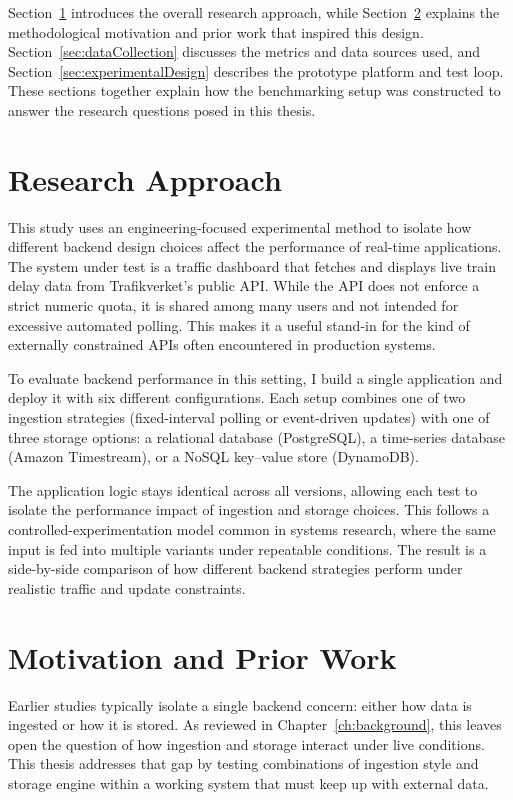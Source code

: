\documentclass[nomenclature, english, biblatex]{kththesis}
\numberwithin{listing}{chapter}
\begin{document}
Section~\ref{sec:researchProcess} introduces the overall research approach, while Section~\ref{sec:researchParadigm} explains the methodological motivation and prior work that inspired this design. Section~\ref{sec:dataCollection} discusses the metrics and data sources used, and Section~\ref{sec:experimentalDesign} describes the prototype platform and test loop. These sections together explain how the benchmarking setup was constructed to answer the research questions posed in this thesis.

\section{Research Approach}
\label{sec:researchProcess}

This study uses an engineering-focused experimental method to isolate how different backend design choices affect the performance of real-time applications. The system under test is a traffic dashboard that fetches and displays live train delay data from Trafikverket’s public API. While the API does not enforce a strict numeric quota, it is shared among many users and not intended for excessive automated polling. This makes it a useful stand-in for the kind of externally constrained APIs often encountered in production systems.

To evaluate backend performance in this setting, I build a single application and deploy it with six different configurations. Each setup combines one of two ingestion strategies (fixed-interval polling or event-driven updates) with one of three storage options: a relational database (PostgreSQL), a time-series database (Amazon Timestream), or a NoSQL key–value store (DynamoDB).

The application logic stays identical across all versions, allowing each test to isolate the performance impact of ingestion and storage choices. This follows a controlled-experimentation model common in systems research, where the same input is fed into multiple variants under repeatable conditions. The result is a side-by-side comparison of how different backend strategies perform under realistic traffic and update constraints.

\section{Motivation and Prior Work}
\label{sec:researchParadigm}

Earlier studies typically isolate a single backend concern: either how data is ingested or how it is stored. As reviewed in Chapter~\ref{ch:background}, this leaves open the question of how ingestion and storage interact under live conditions. This thesis addresses that gap by testing combinations of ingestion style and storage engine within a working system that must keep up with external data.
\end{document}
